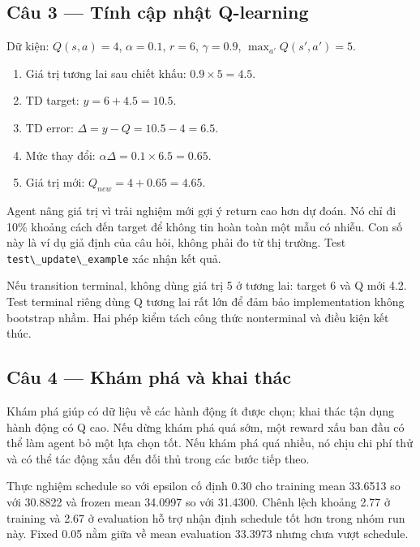 \subsection{Câu 3 --- Tính cập nhật
Q-learning}\label{cuxe2u-3-tuxednh-cux1eadp-nhux1eadt-q-learning}

Dữ kiện: \(Q(s,a)=4\), \(\alpha=0.1\), \(r=6\), \(\gamma=0.9\),
\(\max_{a'}Q(s',a')=5\).

\begin{enumerate}
\def\labelenumi{\arabic{enumi}.}
\tightlist
\item
  Giá trị tương lai sau chiết khấu: \(0.9\times5=4.5\).
\item
  TD target: \(y=6+4.5=10.5\).
\item
  TD error: \(\Delta=y-Q=10.5-4=6.5\).
\item
  Mức thay đổi: \(\alpha\Delta=0.1\times6.5=0.65\).
\item
  Giá trị mới: \(Q_{new}=4+0.65=\mathbf{4.65}\).
\end{enumerate}

Agent nâng giá trị vì trải nghiệm mới gợi ý return cao hơn dự đoán. Nó
chỉ đi 10\% khoảng cách đến target để không tin hoàn toàn một mẫu có
nhiễu. Con số này là ví dụ giả định của câu hỏi, không phải đo từ thị
trường. Test \passthrough{\lstinline!test\_update\_example!} xác nhận
kết quả.

Nếu transition terminal, không dùng giá trị 5 ở tương lai: target 6 và Q
mới 4.2. Test terminal riêng dùng Q tương lai rất lớn để đảm bảo
implementation không bootstrap nhầm. Hai phép kiểm tách công thức
nonterminal và điều kiện kết thúc.

\subsection{Câu 4 --- Khám phá và khai
thác}\label{cuxe2u-4-khuxe1m-phuxe1-vuxe0-khai-thuxe1c}

Khám phá giúp có dữ liệu về các hành động ít được chọn; khai thác tận
dụng hành động có Q cao. Nếu dừng khám phá quá sớm, một reward xấu ban
đầu có thể làm agent bỏ một lựa chọn tốt. Nếu khám phá quá nhiều, nó
chịu chi phí thử và có thể tác động xấu đến đối thủ trong các bước tiếp
theo.

Thực nghiệm schedule so với epsilon cố định 0.30 cho training mean
33.6513 so với 30.8822 và frozen mean 34.0997 so với 31.4300. Chênh lệch
khoảng 2.77 ở training và 2.67 ở evaluation hỗ trợ nhận định schedule
tốt hơn trong nhóm run này. Fixed 0.05 nằm giữa về mean evaluation
33.3973 nhưng chưa vượt schedule.

